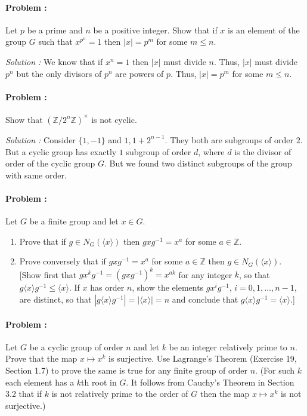 \paragraph{Problem :} Let $p$ be a prime and $n$ be a positive integer. Show that if $x$ is an element of the group $G$ such that $x^{p^n}=1$
then $|x|=p^m$ for some $m \le n$.

\vspace{4mm}
\textit{Solution :} We know that if $x^n=1$ then $|x|$ must divide $n$. Thus, $|x|$ must divide $p^n$ but the only divisors of $p^n$ are 
powers of $p$. Thus, $|x|=p^m$ for some $m \le n$.


\paragraph{Problem :} Show that $(\mathbb{Z}/2^n \mathbb{Z})^{\times}$ is not cyclic.

\vspace{4mm}
\textit{Solution :} Consider $\{1,-1\}$ and ${1,1+2^{n-1}}$. They both are subgroups of order $2$. But a cyclic group has exactly $1$ 
subgroup of order $d$, where $d$ is the divisor of order of the cyclic group $G$. But we found two distinct subgroups of the group with same
order.

\paragraph{Problem :} Let $G$ be a finite group and let $x \in G$.
  \begin{enumerate}
    \item Prove that if $g \in N_G(\langle x \rangle)$ then $gxg^{-1} = x^a$ for some $a \in \mathbb{Z}$.
    \item Prove conversely that if $gxg^{-1} = x^a$ for some $a \in \mathbb{Z}$ then $g \in N_G(\langle x \rangle)$. 
    [Show first that $g x^k g^{-1} = (gxg^{-1})^k = x^{ak}$ for any integer $k$, so that 
    $g \langle x \rangle g^{-1} \leq \langle x \rangle$. If $x$ has order $n$, show the elements 
    $gx^i g^{-1}$, $i=0,1,\dots,n-1$, are distinct, so that 
    $|g \langle x \rangle g^{-1}| = |\langle x \rangle| = n$ and conclude that 
    $g \langle x \rangle g^{-1} = \langle x \rangle$.]
  \end{enumerate}

\paragraph{Problem :} Let $G$ be a cyclic group of order $n$ and let $k$ be an integer relatively prime to $n$. 
  Prove that the map $x \mapsto x^k$ is surjective. Use Lagrange's Theorem 
  (Exercise 19, Section 1.7) to prove the same is true for any finite group of order $n$. 
  (For such $k$ each element has a $k$th root in $G$. It follows from Cauchy’s Theorem in 
  Section 3.2 that if $k$ is not relatively prime to the order of $G$ then the map $x \mapsto x^k$ 
  is not surjective.)

